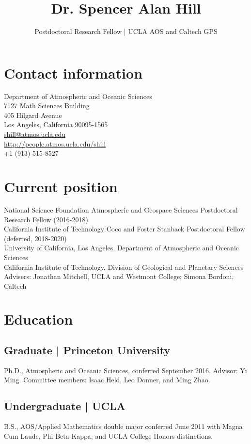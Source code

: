\documentclass{article}
\author{Postdoctoral Research Fellow | UCLA AOS and Caltech GPS}
\date{}
\title{Dr. Spencer Alan Hill}
\begin{document}
\maketitle
\section*{Contact information}
\label{sec:org12984c7}
Department of Atmospheric and Oceanic Sciences\\
7127 Math Sciences Building\\
405 Hilgard Avenue\\
Los Angeles, California 90095-1565\\

\href{mailto:shill@atmos.ucla.edu}{shill@atmos.ucla.edu}\\
\url{http://people.atmos.ucla.edu/shill}\\
+1 (913) 515-8527
\section*{Current position}
\label{sec:orgb8c4c34}
National Science Foundation Atmospheric and Geospace Sciences Postdoctoral
Research Fellow (2016-2018)\\
California Institute of Technology Coco and Foster Stanback Postdoctoral Fellow
(deferred, 2018-2020)\\
University of California, Los Angeles, Department of Atmospheric and Oceanic
Sciences\\
California Institute of Technology, Division of Geological and Planetary
Sciences\\
Advisers: Jonathan Mitchell, UCLA and Westmont College; Simona Bordoni, Caltech\\
\section*{Education}
\label{sec:orgf343802}
\subsection*{Graduate | Princeton University}
\label{sec:orga23a313}
Ph.D., Atmospheric and Oceanic Sciences, conferred September 2016.  Advisor: Yi
Ming.  Committee members: Isaac Held, Leo Donner, and Ming Zhao.
\subsection*{Undergraduate | UCLA}
\label{sec:org084d079}
B.S., AOS/Applied Mathematics double major conferred June 2011 with
Magna Cum Laude, Phi Beta Kappa, and UCLA College Honors distinctions.
\end{document}

